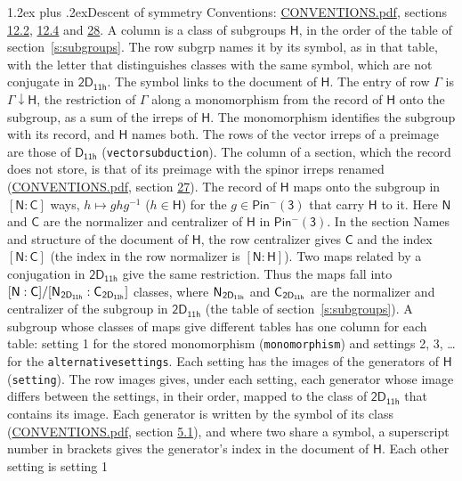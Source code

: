 \documentclass[10pt,a4paper]{article}
\makeatletter
\renewcommand\section{\@startsection{section}{1}{\z@}{-3ex plus -1ex minus -.2ex}%
  {1.2ex plus .2ex}{\normalfont\large\sffamily\bfseries\color{parttitle}}}
\numberwithin{equation}{section}
\newcommand{\grp}[1]{\mathsf{#1}}
\newcommand{\grpindex}[2]{[#1 : #2]}
\newcommand{\restr}[2]{#1\!\downarrow#2}
\newcommand{\hairsp}{\mkern1mu}
\makeatother
\begin{document}
\section{Descent of symmetry}\label{s:subduction}
Conventions: \href{../../CONVENTIONS.pdf}{CONVENTIONS.pdf}, sections \href{../../../rotation/CONVENTIONS.pdf\#conv.12.2}{12.2}, \href{../../../rotation/CONVENTIONS.pdf\#conv.12.4}{12.4} and \href{../../CONVENTIONS.pdf\#conv.28}{28}.
A column is a class of subgroups $\grp{H}$, in the order of the table of section~\ref{s:subgroups}. The row subgrp names it by its symbol, as in that table, with the letter that distinguishes classes with the same symbol, which are not conjugate in $\grp{2D_{11h}}$. The symbol links to the document of $\grp{H}$. The entry of row $\Gamma$ is $\restr{\Gamma}{\grp{H}}$, the restriction of $\Gamma$ along a monomorphism from the record of $\grp{H}$ onto the subgroup, as a sum of the irreps of $\grp{H}$. The monomorphism identifies the subgroup with its record, and $\grp{H}$ names both. The rows of the vector irreps of a preimage are those of \href{../../../rotation/data/pdf/D11h.pdf}{$\grp{D_{11h}}$} (\texttt{vectorsubduction}). The column of a section, which the record does not store, is that of its preimage with the spinor irreps renamed (\href{../../CONVENTIONS.pdf}{CONVENTIONS.pdf}, section \href{../../CONVENTIONS.pdf\#conv.27}{27}). \label{n:group.normalizer.o3}\label{n:group.centralizer.o3}\label{n:element.h}The record of $\grp{H}$ maps onto the subgroup in $\grpindex{\grp{N}}{\grp{C}}$ ways, $h \mapsto g h g^{-1}$ ($h \in \grp{H}$) for the $g \in \grp{Pin^{-}(3)}$ that carry $\grp{H}$ to it. Here $\grp{N}$ and $\grp{C}$ are the normalizer and centralizer of $\grp{H}$ in \href{Pinminus3.pdf}{$\grp{Pin^{-}(3)}$}. In the section Names and structure of the document of $\grp{H}$, the row centralizer gives $\grp{C}$ and the index $\grpindex{\grp{N}}{\grp{C}}$ (the index in the row normalizer is $\grpindex{\grp{N}}{\grp{H}}$). Two maps related by a conjugation in $\grp{2D_{11h}}$ give the same restriction. Thus the maps fall into $\grpindex{\grp{N}}{\grp{C}}/\grpindex{\grp{N}_{\hairsp \grp{2D_{11h}}}}{\grp{C}_{\hairsp \grp{2D_{11h}}}}$ classes, where $\grp{N}_{\hairsp \grp{2D_{11h}}}$ and $\grp{C}_{\hairsp \grp{2D_{11h}}}$ are the normalizer and centralizer of the subgroup in $\grp{2D_{11h}}$ (the table of section~\ref{s:subgroups}). \label{n:head.setting}A subgroup whose classes of maps give different tables has one column for each table: setting 1 for the stored monomorphism (\texttt{monomorphism}) and settings 2, 3, \dots{} for the \texttt{alternativesettings}. Each setting has the images of the generators of $\grp{H}$ (\texttt{setting}). \label{n:head.images}The row images gives, under each setting, each generator whose image differs between the settings, in their order, mapped to the class of $\grp{2D_{11h}}$ that contains its image. Each generator is written by the symbol of its class (\href{../../CONVENTIONS.pdf}{CONVENTIONS.pdf}, section \href{../../../rotation/CONVENTIONS.pdf\#conv.5.1}{5.1}), and where two share a symbol, a superscript number in brackets gives the generator's index in the document of $\grp{H}$. \label{n:irrep.Delta}Each other setting is setting 1 
\end{document}
